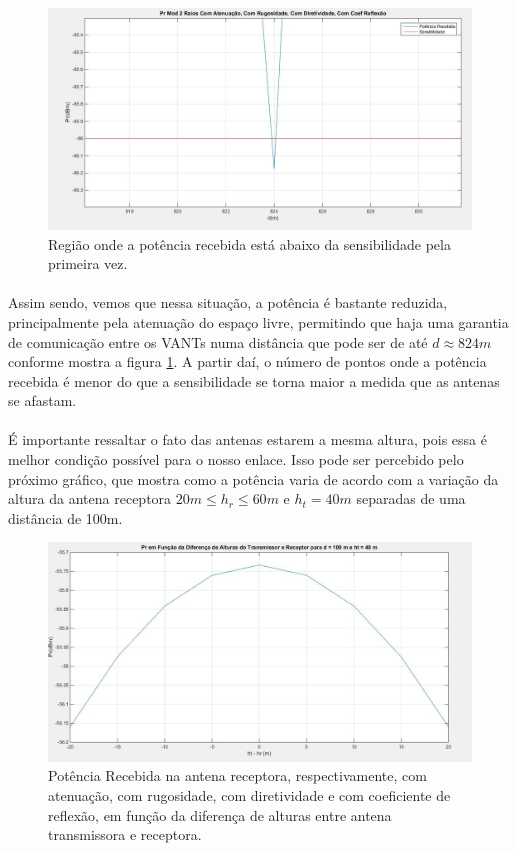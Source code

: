 \FloatBarrier
\begin{figure}[!htp]
\centering
\includegraphics[scale = 0.3]{Figuras/CA_CR_CD_CCR_4.JPG}
\caption{Região onde a potência recebida está abaixo da sensibilidade pela primeira vez.}
\label{completo_2}
\end{figure}
\FloatBarrier

\paragraph{}Assim sendo, vemos que nessa situação, a potência é bastante reduzida, principalmente pela atenuação do espaço livre, permitindo que haja uma garantia de comunicação entre os VANTs numa distância que pode ser de até $d \approx 824m$ conforme mostra a figura \ref{completo_2}. A partir daí, o número de pontos onde a potência recebida é menor do que a sensibilidade se torna maior a medida que as antenas se afastam.

\paragraph{}É importante ressaltar o fato das antenas estarem a mesma altura, pois essa é melhor condição possível para o nosso enlace. Isso pode ser percebido pelo próximo gráfico, que mostra como a potência varia de acordo com a variação da altura da antena receptora $20m \leq h_r \leq 60m$ e $h_t = 40m$ separadas de uma distância de 100m.

\FloatBarrier
\begin{figure}[!htp]
\centering
\includegraphics[scale = 0.3]{Figuras/Diferenca_Altura.JPG}
\caption{Potência Recebida na antena receptora, respectivamente, com atenuação, com rugosidade, com diretividade e com coeficiente de reflexão, em função da diferença de alturas entre antena transmissora e receptora.}
\end{figure}
\FloatBarrier

